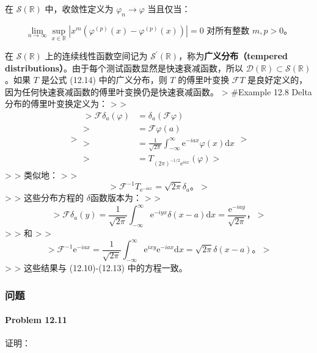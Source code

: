 在 \(\mathcal{S}(\mathbb{R})\) 中，收敛性定义为
\(\varphi_n \to \varphi\) 当且仅当：

\[
\lim_{n \to \infty} \sup_{x \in \mathbb{R}} \left|x^m \left(\varphi^{(p)}(x) - \varphi^{(p)}(x)\right)\right| = 0 \text{ 对所有整数 } m, p > 0。
\]

在 \(\mathcal{S}(\mathbb{R})\) 上的连续线性函数空间记为
\(\mathcal{S}^\prime(\mathbb{R})\)，称为\textbf{广义分布（tempered
distributions）}。由于每个测试函数显然是快速衰减函数，所以
\(\mathcal{D}(\mathbb{R}) \subset \mathcal{S}(\mathbb{R})\)。如果 \(T\)
是公式 (12.14) 中的广义分布，则 \(T\) 的傅里叶变换 \(\mathcal{F} T\)
是良好定义的，因为任何快速衰减函数的傅里叶变换仍是快速衰减函数。
\textgreater{} \#Example 12.8 Delta分布的傅里叶变换定义为：
\textgreater{} \textgreater{} \[
> \begin{aligned}
> \mathcal{F} \delta_{a}(\varphi) & = \delta_{a}(\mathcal{F} \varphi) \\
> & = \mathcal{F} \varphi(a) \\
> & = \frac{1}{\sqrt{2 \pi}} \int_{-\infty}^\infty \mathrm{e}^{-i a x} \varphi(x) \mathrm{d} x \\
> & = T_{(2 \pi)^{-1 / 2} \mathrm{e}^{i a x}}(\varphi)
> \end{aligned}
> \] \textgreater{} \textgreater{} 类似地： \textgreater{}
\textgreater{} \[
> \mathcal{F}^{-1} T_{\mathrm{e}^{-i a x}} = \sqrt{2 \pi} \delta_{a}。
> \] \textgreater{} \textgreater{} 这些分布方程的 $\delta$函数版本为：
\textgreater{} \textgreater{} \[
> \mathcal{F} \delta_{a}(y) = \frac{1}{\sqrt{2 \pi}} \int_{-\infty}^\infty \mathrm{e}^{-i y x} \delta(x-a) \mathrm{d} x = \frac{\mathrm{e}^{-i a y}}{\sqrt{2 \pi}}，
> \] \textgreater{} \textgreater{} 和 \textgreater{} \textgreater{} \[
> \mathcal{F}^{-1} \mathrm{e}^{-i a x} = \frac{1}{\sqrt{2 \pi}} \int_{-\infty}^\infty \mathrm{e}^{i x y} \mathrm{e}^{-i a x} \mathrm{d} x = \sqrt{2 \pi} \delta(x-a)。
> \] \textgreater{} \textgreater{} 这些结果与 (12.10)-(12.13)
中的方程一致。

\subsubsection{问题}\label{ux95eeux9898-2}

\paragraph{Problem 12.11}\label{problem-12.11}

证明：

